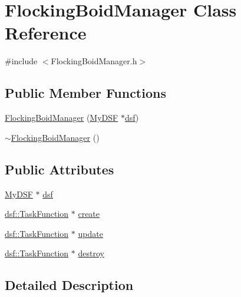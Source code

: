 \hypertarget{class_flocking_boid_manager}{}\section{Flocking\+Boid\+Manager Class Reference}
\label{class_flocking_boid_manager}


{\ttfamily \#include $<$Flocking\+Boid\+Manager.\+h$>$}

\subsection*{Public Member Functions}
\begin{DoxyCompactItemize}
\item 
\hyperlink{class_flocking_boid_manager_a54782df4dd7271ffae97e3cf0fd5e8a1}{Flocking\+Boid\+Manager} (\hyperlink{class_my_d_s_f}{My\+D\+S\+F} $\ast$\hyperlink{class_flocking_boid_manager_a9a564c99978c8e6115562472544bb839}{dsf})
\item 
\hyperlink{class_flocking_boid_manager_ad9a7f5d35a1867a60b55b1160a8068ab}{$\sim$\+Flocking\+Boid\+Manager} ()
\end{DoxyCompactItemize}
\subsection*{Public Attributes}
\begin{DoxyCompactItemize}
\item 
\hyperlink{class_my_d_s_f}{My\+D\+S\+F} $\ast$ \hyperlink{class_flocking_boid_manager_a9a564c99978c8e6115562472544bb839}{dsf}
\item 
\hyperlink{namespacedsf_aa16e735f29587f4485b56fc46746f7a9}{dsf\+::\+Task\+Function} $\ast$ \hyperlink{class_flocking_boid_manager_adba8774f051608d3aa3591cd848087bb}{create}
\item 
\hyperlink{namespacedsf_aa16e735f29587f4485b56fc46746f7a9}{dsf\+::\+Task\+Function} $\ast$ \hyperlink{class_flocking_boid_manager_a53cd9d7409eb6169290c4447c82c4906}{update}
\item 
\hyperlink{namespacedsf_aa16e735f29587f4485b56fc46746f7a9}{dsf\+::\+Task\+Function} $\ast$ \hyperlink{class_flocking_boid_manager_a71e9958bd298f68630681364bd0677f8}{destroy}
\end{DoxyCompactItemize}


\subsection{Detailed Description}


